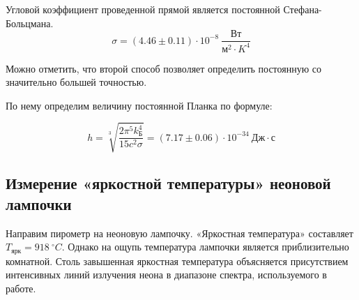 \documentclass[14pt, a4paper]{report}
\begin{document}
Угловой коэффициент проведенной прямой является постоянной Стефана-Больцмана.
\[\sigma=(4.46\pm0.11)\cdot10^{-8}\ \frac{Вт}{м^2\cdot K^4}\]

Можно отметить, что второй способ позволяет определить постоянную со значительно большей точностью.

По нему определим величину постоянной Планка по формуле:

\[h=\sqrt[3]{\frac{2\pi^5 k_Б^4}{15c^2\sigma}}=(7.17\pm0.06)\cdot10^{-34}\ Дж\cdot с\]

\subsection{Измерение «яркостной температуры» неоновой лампочки}

Направим пирометр на неоновую лампочку. «Яркостная температура» составляет $T_{ярк}=918\ ^\circ C$. Однако на ощупь температура лампочки является приблизительно комнатной. Столь завышенная яркостная температура объясняется присутствием интенсивных линий излучения неона в диапазоне спектра, используемого в работе.
\end{document}
